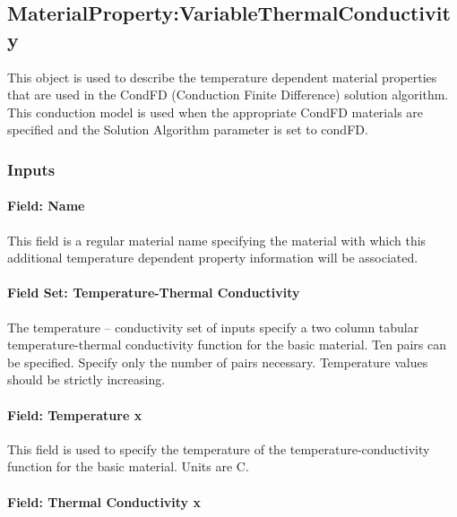 \subsection{MaterialProperty:VariableThermalConductivity}\label{materialpropertyvariablethermalconductivity}

This object is used to describe the temperature dependent material properties that are used in the CondFD (Conduction Finite Difference) solution algorithm. This conduction model is used when the appropriate CondFD materials are specified and the Solution Algorithm parameter is set to condFD.

\subsubsection{Inputs}\label{inputs-6-027}

\paragraph{Field: Name}\label{field-name-6-022}

This field is a regular material name specifying the material with which this additional temperature dependent property information will be associated.

\paragraph{Field Set: Temperature-Thermal Conductivity}\label{field-set-temperature-thermal-conductivity}

The temperature -- conductivity set of inputs specify a two column tabular temperature-thermal conductivity function for the basic material. Ten pairs can be specified. Specify only the number of pairs necessary. Temperature values should be strictly increasing.

\paragraph{Field: Temperature x}\label{field-temperature-x-1}

This field is used to specify the temperature of the temperature-conductivity function for the basic material. Units are C.

\paragraph{Field: Thermal Conductivity x}\label{field-thermal-conductivity-x}

